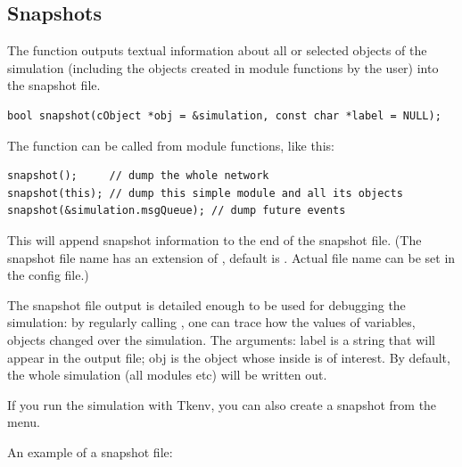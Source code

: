 \subsection{Snapshots}
\label{sec:ch-sim-lib:snapshots}

The  function outputs textual information about all
or selected objects of the simulation (including the objects created
in module functions by the user) into the snapshot file.

\begin{verbatim}
bool snapshot(cObject *obj = &simulation, const char *label = NULL);
\end{verbatim}


The function can be called from module functions, like this:

\begin{verbatim}
snapshot();     // dump the whole network
snapshot(this); // dump this simple module and all its objects
snapshot(&simulation.msgQueue); // dump future events
\end{verbatim}

This will append snapshot information to the end of the snapshot file.
(The snapshot file name has an extension of , default is
. Actual file name can be set in the
config file.)


The snapshot file output is detailed enough to be used for debugging
the simulation: by regularly calling , one can trace
how the values of variables, objects changed over the simulation.
The arguments: label is a string that will appear in the output
file; obj is the object whose inside is of interest. By default,
the whole simulation (all modules etc) will be written out.

If you run the simulation with Tkenv, you can also create a snapshot
from the menu.


An example of a snapshot file:

